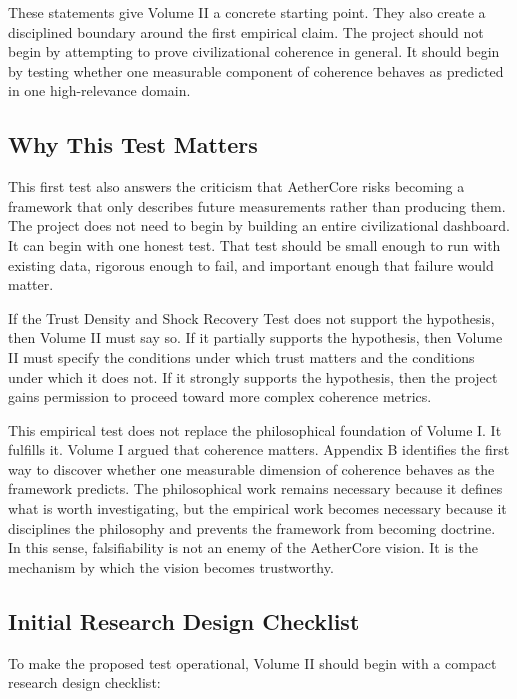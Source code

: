 \documentclass[12pt]{article}
\begin{document}
These statements give Volume II a concrete starting point. They also create a disciplined boundary around the first empirical claim. The project should not begin by attempting to prove civilizational coherence in general. It should begin by testing whether one measurable component of coherence behaves as predicted in one high-relevance domain.

\subsection{Why This Test Matters}

This first test also answers the criticism that AetherCore risks becoming a framework that only describes future measurements rather than producing them. The project does not need to begin by building an entire civilizational dashboard. It can begin with one honest test. That test should be small enough to run with existing data, rigorous enough to fail, and important enough that failure would matter.

If the Trust Density and Shock Recovery Test does not support the hypothesis, then Volume II must say so. If it partially supports the hypothesis, then Volume II must specify the conditions under which trust matters and the conditions under which it does not. If it strongly supports the hypothesis, then the project gains permission to proceed toward more complex coherence metrics.

This empirical test does not replace the philosophical foundation of Volume I. It fulfills it. Volume I argued that coherence matters. Appendix B identifies the first way to discover whether one measurable dimension of coherence behaves as the framework predicts. The philosophical work remains necessary because it defines what is worth investigating, but the empirical work becomes necessary because it disciplines the philosophy and prevents the framework from becoming doctrine. In this sense, falsifiability is not an enemy of the AetherCore vision. It is the mechanism by which the vision becomes trustworthy.

\subsection{Initial Research Design Checklist}

To make the proposed test operational, Volume II should begin with a compact research design checklist:
\end{document}
